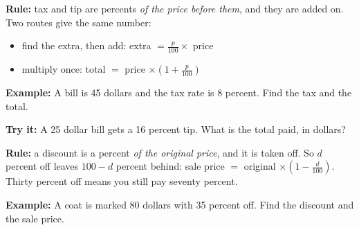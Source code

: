 \documentclass[12pt]{article}
\begin{document}


\begin{formulabox}
\textbf{Rule:} tax and tip are percents \emph{of the price before them}, and
they are added on. Two routes give the same number:
\begin{itemize}[leftmargin=1.1cm, itemsep=1pt, topsep=2pt]
  \item find the extra, then add: extra $= \frac{p}{100} \times$ price
  \item multiply once: total $= $ price $\times \left(1 + \frac{p}{100}\right)$
\end{itemize}
\end{formulabox}

\begin{examplebox}
\textbf{Example:} \quad A bill is 45 dollars and the tax rate is 8 percent. Find
the tax and the total.
\end{examplebox}

\begin{tryitbox}
\textbf{Try it:} \quad A 25 dollar bill gets a 16 percent tip. What is the total
paid, in dollars?\\[2pt]
\end{tryitbox}


\begin{formulabox}
\textbf{Rule:} a discount is a percent \emph{of the original price}, and it is
taken off. So $d$ percent off leaves $100 - d$ percent behind:
sale price $= $ original $\times \left(1 - \frac{d}{100}\right)$. Thirty percent
off means you still pay seventy percent.
\end{formulabox}

\begin{examplebox}
\textbf{Example:} \quad A coat is marked 80 dollars with 35 percent off. Find
the discount and the sale price.
\end{examplebox}
\end{document}
